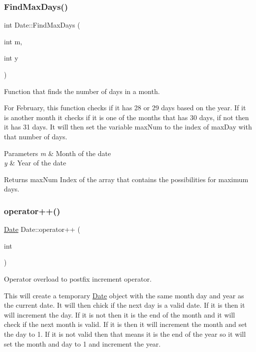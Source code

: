 \subsubsection{\texorpdfstring{FindMaxDays()}{FindMaxDays()}}
{\footnotesize\ttfamily int Date\+::\+Find\+Max\+Days (\begin{DoxyParamCaption}\item[{int}]{m,  }\item[{int}]{y }\end{DoxyParamCaption})\hspace{0.3cm}{\ttfamily [inline]}}



Function that finds the number of days in a month. 

For February, this function checks if it has 28 or 29 days based on the year. If it is another month it checks if it is one of the months that has 30 days, if not then it has 31 days. It will then set the variable {\ttfamily max\+Num} to the index of {\ttfamily max\+Day} with that number of days.


\begin{DoxyParams}{Parameters}
{\em m} & Month of the date \\
\hline
{\em y} & Year of the date\\
\hline
\end{DoxyParams}
\begin{DoxyReturn}{Returns}
max\+Num Index of the array that contains the possibilities for maximum days. 
\end{DoxyReturn}
\mbox{\label{class_date_a63f7060a7a7997e289e5e885f84557e5}} 
\subsubsection{\texorpdfstring{operator++()}{operator++()}}
{\footnotesize\ttfamily \mbox{\hyperlink{class_date}{Date}} Date\+::operator++ (\begin{DoxyParamCaption}\item[{int}]{ }\end{DoxyParamCaption})\hspace{0.3cm}{\ttfamily [inline]}}



Operator overload to postfix increment operator. 

This will create a temporary \mbox{\hyperlink{class_date}{Date}} object with the same month day and year as the current date. It will then chick if the next day is a valid date. If it is then it will increment the day. If it is not then it is the end of the month and it will check if the next month is valid. If it is then it will increment the month and set the day to 1. If it is not valid then that means it is the end of the year so it will set the month and day to 1 and increment the year.

